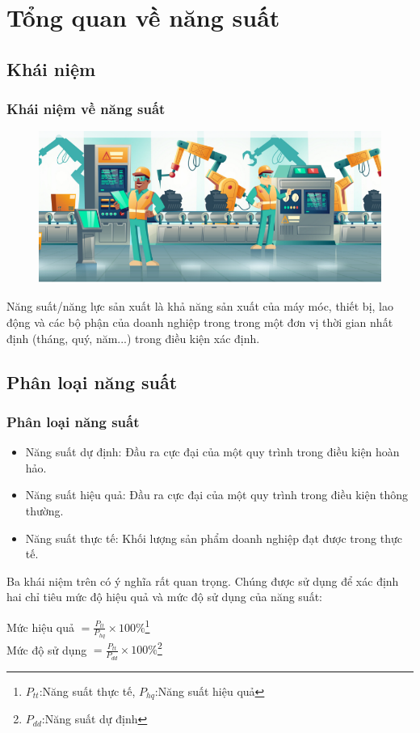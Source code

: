 \documentclass[10pt]{beamer}
\begin{document}
\section{Tổng quan về năng suất}


\subsection{Khái niệm}
\begin{frame}
\transsplitverticalin
\frametitle{Khái niệm về năng suất}

\begin{figure}
\includegraphics[scale=0.5]{Figs/khainiem}
\end{figure}

Năng suất/năng lực sản xuất là khả năng sản xuất của máy móc, thiết bị, lao động và
các bộ phận của doanh nghiệp trong trong một đơn vị thời gian nhất định (tháng, quý,
năm...) trong điều kiện xác định.

\end{frame}

\subsection{Phân loại năng suất}
\begin{frame}
\transsplitverticalout
\frametitle{Phân loại năng suất}

\begin{itemize}
\item Năng suất dự định: Đầu ra cực đại của một quy trình trong điều kiện hoàn hảo.
\item Năng suất hiệu quả: Đầu ra cực đại của một quy trình trong điều kiện thông thường.
\item Năng suất thực tế: Khối lượng sản phẩm doanh nghiệp đạt được trong
thực tế.
\end{itemize}
Ba khái niệm trên có ý nghĩa rất quan trọng. Chúng được sử dụng để xác định hai chỉ tiêu mức độ hiệu quả và mức độ sử dụng của năng suất:\\
\begin{center}
Mức hiệu quả $= \frac{P_{tt}}{P_{hq}} \times 100\%$\footnote{$P_{tt}$:Năng suất thực tế, $P_{hq}$:Năng suất hiệu quả}\\

Mức độ sử dụng $= \frac{P_{tt}}{P_{dd}} \times 100\%$\footnote{$P_{dd}$:Năng suất dự định}
\end{center}

\end{frame}
\end{document}
